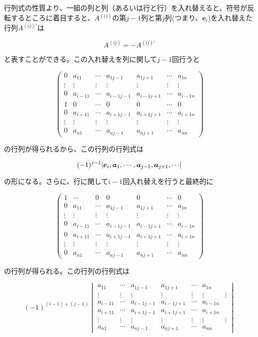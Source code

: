 \documentclass[dvipdfmx,autodetect-engine]{jsarticle}
\DeclarePairedDelimiter{\abs}{\lvert}{\rvert}
\begin{document}
行列式の性質より、一組の列と列（あるいは行と行）を入れ替えると、符号が反転するところに着目すると、$A^{(ij)}$の第$j-1$列と第$j$列(つまり、$\bm{e}_i$)を入れ替えた行列$A^{(ij)'}$は

$$
A^{(ij)} = -A^{(ij)'}
$$

と表すことができる。この入れ替えを列に関して$j-1$回行うと

$$
\begin{pmatrix*}
0 & a_{11} & \cdots & a_{1{j-1}} & a_{1{j+1}} & \cdots & a_{1n} \\
\vdots & \vdots & \vdots & \vdots & \vdots & \vdots & \vdots \\
0 & a_{{i-1}1} & \cdots & a_{{i-1}{j-1}} & a_{{i-1}{j+1}} & \cdots & a_{{i-1}n} \\
1 & 0 & \cdots & 0 & 0 & \cdots & 0 \\
0 & a_{{i+1}1} & \cdots & a_{{i+1}{j-1}} & a_{{i+1}{j+1}} & \cdots & a_{{i+1}n} \\
\vdots & \vdots & \vdots & \vdots & \vdots & \vdots & \vdots \\
0 & a_{n1} & \cdots & a_{n{j-1}} & a_{n{j+1}} & \cdots & a_{nn}
\end{pmatrix*}
$$

の行列が得られるから、この行列の行列式は

$$
(-1)^{j-1}\abs{\bm{e}_i, \bm{a}_1, \cdots, \bm{a}_{j-1}, \bm{a}_{j+1}, \cdots}
$$

の形になる。さらに、行に関して$i-1$回入れ替えを行うと最終的に

$$
\begin{pmatrix*}
1 & \cdots & 0 & 0 & 0 & \cdots & 0 \\
0 & a_{11} & \cdots & a_{1{j-1}} & a_{1{j+1}} & \cdots & a_{1n} \\
\vdots & \vdots & \vdots & \vdots & \vdots & \vdots & \vdots \\
0 & a_{{i-1}1} & \cdots & a_{{i-1}{j-1}} & a_{{i-1}{j+1}} & \cdots & a_{{i-1}n} \\
0 & a_{{i+1}1} & \cdots & a_{{i+1}{j-1}} &a_{{i+1}{j+1}} & \cdots & a_{{i+1}n} \\
\vdots & \vdots & \vdots & \vdots &\vdots & \vdots & \vdots \\
0 & a_{n1} & \cdots & a_{n{j-1}} &a_{n{j+1}} & \cdots & a_{nn}
\end{pmatrix*}
$$

の行列が得られる。この行列の行列式は

$$
(-1)^{(i-1)+(j-1)}\begin{vmatrix}
a_{11} & \cdots & a_{1{j-1}} & a_{1{j+1}} & \cdots & a_{1n} \\
\vdots & \vdots & \vdots & \vdots & \vdots & \vdots & \vdots \\
a_{{i-1}1} & \cdots & a_{{i-1}{j-1}} & a_{{i-1}{j+1}} & \cdots & a_{{i-1}n} \\
a_{{i+1}1} & \cdots & a_{{i+1}{j-1}} &a_{{i+1}{j+1}} & \cdots & a_{{i+1}n} \\
\vdots & \vdots & \vdots & \vdots &\vdots & \vdots & \vdots \\
a_{n1} & \cdots & a_{n{j-1}} &a_{n{j+1}} & \cdots & a_{nn}
\end{vmatrix}
$$
\end{document}
